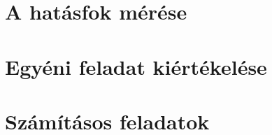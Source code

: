 \begin{multicols}{2}
\section{A hatásfok mérése}


\section{Egyéni feladat kiértékelése}


\section{Számításos feladatok}


\end{multicols}